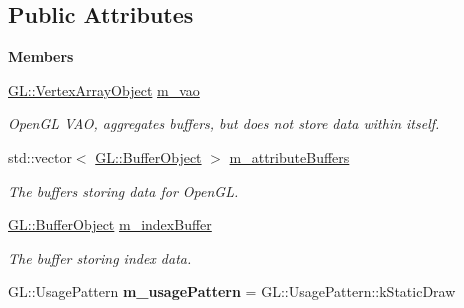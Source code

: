 \subsection*{Public Attributes}
\begin{Indent}\textbf{ Members}\par
\begin{DoxyCompactItemize}
\item 
\mbox{\label{classrev_1_1_vertex_array_data_af028613b41d725c1432b2cbb1012df26}} 
\mbox{\hyperlink{classrev_1_1_g_l_1_1_vertex_array_object}{G\+L\+::\+Vertex\+Array\+Object}} \mbox{\hyperlink{classrev_1_1_vertex_array_data_af028613b41d725c1432b2cbb1012df26}{m\+\_\+vao}}
\begin{DoxyCompactList}\small\item\em Open\+GL V\+AO, aggregates buffers, but does not store data within itself. \end{DoxyCompactList}\item 
\mbox{\label{classrev_1_1_vertex_array_data_ae909b5b29847ccea019dd14e350ada40}} 
std\+::vector$<$ \mbox{\hyperlink{classrev_1_1_g_l_1_1_buffer_object}{G\+L\+::\+Buffer\+Object}} $>$ \mbox{\hyperlink{classrev_1_1_vertex_array_data_ae909b5b29847ccea019dd14e350ada40}{m\+\_\+attribute\+Buffers}}
\begin{DoxyCompactList}\small\item\em The buffers storing data for Open\+GL. \end{DoxyCompactList}\item 
\mbox{\label{classrev_1_1_vertex_array_data_ab6905e041b3c02214b40d60165302976}} 
\mbox{\hyperlink{classrev_1_1_g_l_1_1_buffer_object}{G\+L\+::\+Buffer\+Object}} \mbox{\hyperlink{classrev_1_1_vertex_array_data_ab6905e041b3c02214b40d60165302976}{m\+\_\+index\+Buffer}}
\begin{DoxyCompactList}\small\item\em The buffer storing index data. \end{DoxyCompactList}\item 
\mbox{\label{classrev_1_1_vertex_array_data_a48140b5a9ac339bfead9dc076e4940e2}} 
G\+L\+::\+Usage\+Pattern {\bfseries m\+\_\+usage\+Pattern} = G\+L\+::\+Usage\+Pattern\+::k\+Static\+Draw
\item 

\end{DoxyCompactItemize}
\end{Indent}
